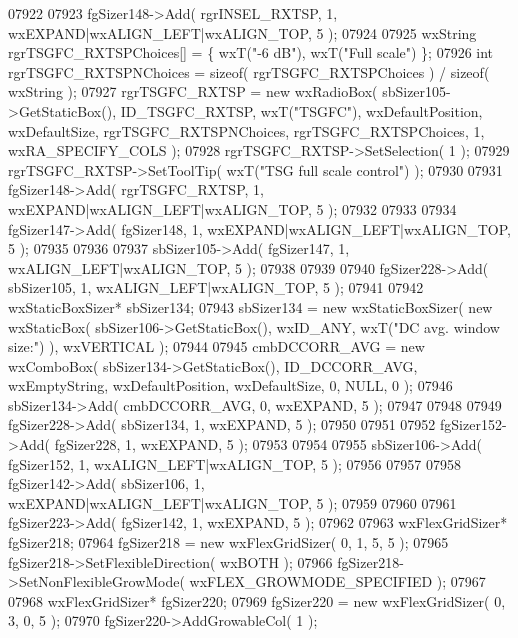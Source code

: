 \begin{DoxyCode}
07922     
07923     fgSizer148->Add( rgrINSEL_RXTSP, 1, wxEXPAND|wxALIGN\_LEFT|wxALIGN\_TOP, 5 );
07924     
07925     wxString rgrTSGFC\_RXTSPChoices[] = \{ wxT(\textcolor{stringliteral}{"-6 dB"}), wxT(\textcolor{stringliteral}{"Full scale"}) \};
07926     \textcolor{keywordtype}{int} rgrTSGFC\_RXTSPNChoices = \textcolor{keyword}{sizeof}( rgrTSGFC\_RXTSPChoices ) / \textcolor{keyword}{sizeof}( wxString );
07927     rgrTSGFC_RXTSP = \textcolor{keyword}{new} wxRadioBox( sbSizer105->GetStaticBox(), ID_TSGFC_RXTSP, wxT(\textcolor{stringliteral}{"TSGFC"}), 
      wxDefaultPosition, wxDefaultSize, rgrTSGFC\_RXTSPNChoices, rgrTSGFC\_RXTSPChoices, 1, wxRA\_SPECIFY\_COLS );
07928     rgrTSGFC_RXTSP->SetSelection( 1 );
07929     rgrTSGFC_RXTSP->SetToolTip( wxT(\textcolor{stringliteral}{"TSG full scale control"}) );
07930     
07931     fgSizer148->Add( rgrTSGFC_RXTSP, 1, wxEXPAND|wxALIGN\_LEFT|wxALIGN\_TOP, 5 );
07932     
07933     
07934     fgSizer147->Add( fgSizer148, 1, wxEXPAND|wxALIGN\_LEFT|wxALIGN\_TOP, 5 );
07935     
07936     
07937     sbSizer105->Add( fgSizer147, 1, wxALIGN\_LEFT|wxALIGN\_TOP, 5 );
07938     
07939     
07940     fgSizer228->Add( sbSizer105, 1, wxALIGN\_LEFT|wxALIGN\_TOP, 5 );
07941     
07942     wxStaticBoxSizer* sbSizer134;
07943     sbSizer134 = \textcolor{keyword}{new} wxStaticBoxSizer( \textcolor{keyword}{new} wxStaticBox( sbSizer106->GetStaticBox(), wxID\_ANY, wxT(\textcolor{stringliteral}{"DC avg.
       window size:"}) ), wxVERTICAL );
07944     
07945     cmbDCCORR_AVG = \textcolor{keyword}{new} wxComboBox( sbSizer134->GetStaticBox(), ID_DCCORR_AVG, wxEmptyString, 
      wxDefaultPosition, wxDefaultSize, 0, NULL, 0 ); 
07946     sbSizer134->Add( cmbDCCORR_AVG, 0, wxEXPAND, 5 );
07947     
07948     
07949     fgSizer228->Add( sbSizer134, 1, wxEXPAND, 5 );
07950     
07951     
07952     fgSizer152->Add( fgSizer228, 1, wxEXPAND, 5 );
07953     
07954     
07955     sbSizer106->Add( fgSizer152, 1, wxALIGN\_LEFT|wxALIGN\_TOP, 5 );
07956     
07957     
07958     fgSizer142->Add( sbSizer106, 1, wxEXPAND|wxALIGN\_LEFT|wxALIGN\_TOP, 5 );
07959     
07960     
07961     fgSizer223->Add( fgSizer142, 1, wxEXPAND, 5 );
07962     
07963     wxFlexGridSizer* fgSizer218;
07964     fgSizer218 = \textcolor{keyword}{new} wxFlexGridSizer( 0, 1, 5, 5 );
07965     fgSizer218->SetFlexibleDirection( wxBOTH );
07966     fgSizer218->SetNonFlexibleGrowMode( wxFLEX\_GROWMODE\_SPECIFIED );
07967     
07968     wxFlexGridSizer* fgSizer220;
07969     fgSizer220 = \textcolor{keyword}{new} wxFlexGridSizer( 0, 3, 0, 5 );
07970     fgSizer220->AddGrowableCol( 1 );

\end{DoxyCode}
